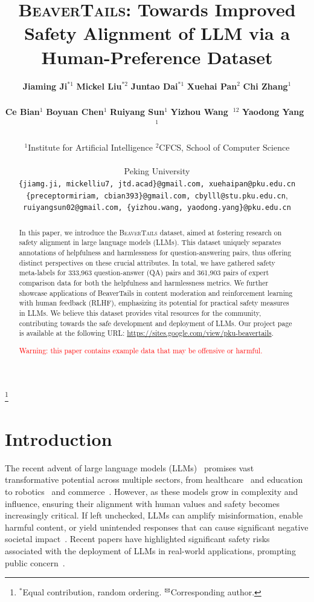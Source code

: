 \documentclass{article}
\title{\textsc{BeaverTails}: Towards Improved Safety Alignment of LLM via a Human-Preference Dataset}
\author{
    \textbf{Jiaming Ji$^{\textbf{*}1}$} \quad
    \textbf{Mickel Liu$^{\textbf{*}2}$} \quad
    \textbf{Juntao Dai$^{\textbf{*}1}$} \quad
    \textbf{Xuehai Pan$^{2}$} \quad 
    \textbf{Chi Zhang$^{1}$} \quad \\
    \vspace{-0.5em} \\
    \textbf{Ce Bian$^{1}$} \quad
    \textbf{Boyuan Chen$^{1}$} \quad
    \textbf{Ruiyang Sun$^{1}$} \quad 
    \textbf{Yizhou Wang~\textsuperscript{\Letter}$^{12}$} \quad 
    \textbf{Yaodong Yang~\textsuperscript{\Letter}$^{1}$}\\
    \vspace{-0.5em} \\
    \textnormal{
    $^{1}$Institute for Artificial Intelligence\quad
    $^{2}$CFCS, School of Computer Science}\\
    \vspace{0em}\\
    \hfill \textnormal{\large Peking University} \hfill
    \vspace{1em}\\
    \texttt{\{jiamg.ji, mickelliu7, jtd.acad\}@gmail.com, xuehaipan@pku.edu.cn}\\
    \texttt{\{preceptormiriam, cbian393\}@gmail.com, cbylll@stu.pku.edu.cn},  \\
    \texttt{ruiyangsun02@gmail.com, \{yizhou.wang, yaodong.yang\}@pku.edu.cn}
}
\newcommand\nnfootnote[1]{%
  \begin{NoHyper}
  \renewcommand\thefootnote{}\footnote{#1}%
  \addtocounter{footnote}{-1}%
  \end{NoHyper}
}
\begin{document}
\nnfootnote{$^*$Equal contribution, random ordering. $\textsuperscript{\Letter}$Corresponding author.}

\maketitle
\begin{abstract}

  In this paper, we introduce the \textsc{BeaverTails} dataset, aimed at fostering research on safety alignment in large language models (LLMs). This dataset uniquely separates annotations of helpfulness and harmlessness for question-answering pairs, thus offering distinct perspectives on these crucial attributes. 
  In total, we have gathered safety meta-labels for 333,963 question-answer (QA) pairs and 361,903 pairs of expert comparison data for both the helpfulness and harmlessness metrics.
  We further showcase applications of BeaverTails in content moderation and reinforcement learning with human feedback (RLHF), emphasizing its potential for practical safety measures in LLMs. We believe this dataset provides vital resources for the community, contributing towards the safe development and deployment of LLMs. Our project page is available at the following URL: \url{https://sites.google.com/view/pku-beavertails}.

  \textcolor{red}{Warning: this paper contains example data that may be offensive or harmful.}

\end{abstract}

\section{Introduction} 
\label{sec:introduction}
The recent advent of large language models (LLMs)~\cite{openai2023gpt4, anil2023palm, touvron2023llama, llama2, yang2023baichuan} promises vast transformative potential across multiple sectors, from healthcare~\cite{yang2022large, moor2023foundation, arora2023promise} and education~\cite{kung2023performance,kasneci2023chatgpt,katz2023gpt} to robotics~\cite{vemprala2023chatgpt, shah2023lm, wu2023tidybot} and commerce~\cite{noauthor_undated-ae}. However, as these models grow in complexity and influence, ensuring their alignment with human values and safety becomes increasingly critical. If left unchecked, LLMs can amplify misinformation, enable harmful content, or yield unintended responses that can cause significant negative societal impact~\cite{Gehman2020-zq, Weidinger2021-mm, Ganguli2022-td, deshpande2023toxicity}. Recent papers have highlighted significant safety risks associated with the deployment of LLMs in real-world applications, prompting public concern~\cite{Christian2023-dt, Chilton2023-uz, Newman2023-hs}. 
\end{document}
